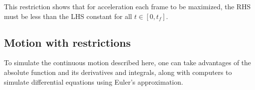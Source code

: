 This restriction shows that for acceleration each frame to be maximized, the RHS must be less than the LHS constant for all $t \in [0, t_f]$.

\subsection{Motion with restrictions}
To simulate the continuous motion described here, one can take advantages of the absolute function and its derivatives and integrals, along with computers to simulate differential equations using Euler's approximation.



